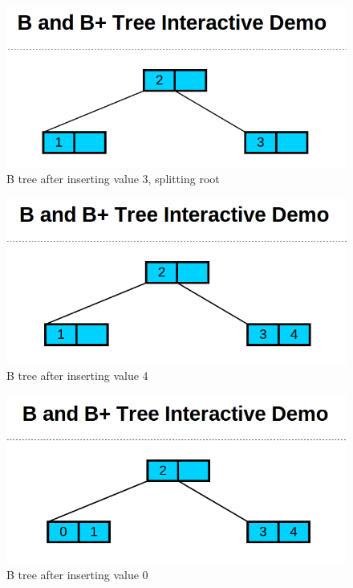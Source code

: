 \begin{figure}[htp]
\centering
\includegraphics[scale=0.25]{images/Insert_three_split_root.png}
\caption{B tree after inserting value 3, splitting root}
\label{EX3}
\end{figure}

\begin{figure}[htp]
\centering
\includegraphics[scale=0.25]{images/Insert_four.png}
\caption{B tree after inserting value 4}
\label{EX4}
\end{figure}

\begin{figure}[htp]
\centering
\includegraphics[scale=0.25]{images/Insert_zero.png}
\caption{B tree after inserting value 0}
\label{EX5}
\end{figure}
